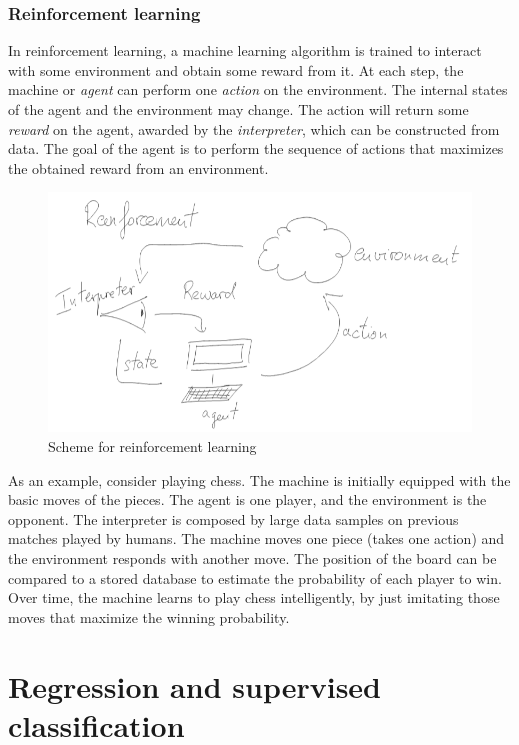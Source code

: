 \documentclass[]{report}
\begin{document}
\subsection{Reinforcement learning}

In reinforcement learning, a machine learning algorithm is trained to interact with some environment and obtain some reward from it. At each step, the machine or \textit{agent} can perform one \textit{action} on the environment. The internal states of the agent and the environment may change. The action will return some \textit{reward} on the agent, awarded by the \textit{interpreter}, which can be constructed from data. The goal of the agent is to perform the sequence of actions that maximizes the obtained reward from an environment. 
\begin{figure}
\includegraphics[width = \linewidth]{images/reinforcement-learning}
\caption{Scheme for reinforcement learning}
\label{fig.reinforcement-learning}
\end{figure}

As an example, consider playing chess. The machine is initially equipped with the basic moves of the pieces. The agent is one player, and the environment is the opponent. The interpreter is composed by large data samples on previous matches played by humans. The machine moves one piece (takes one action) and the environment responds with another move. The position of the board can be compared to a stored database to estimate the probability of each player to win. Over time, the machine learns to play chess intelligently, by just imitating those moves that maximize the winning probability. 


\chapter{Regression and supervised classification}
\end{document}
